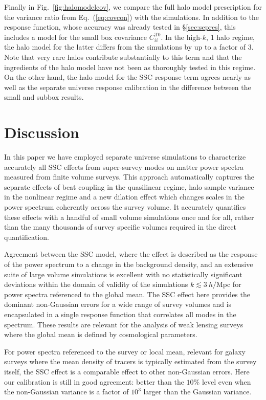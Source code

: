 \documentclass[prd,twocolumn,amsmath,amssymb,floatfix,superscriptaddress]{revtex4-1}
\begin{document}
{
Finally in Fig.~\ref{fig:halomodelcov}, we compare the full halo model prescription for the
variance ratio from Eq.~(\ref{eq:covcon}) with the simulations.   In addition to the 
response function, whose accuracy was already tested in \S \ref{sec:sepres}, this includes
a model for the small box covariance $C_{ii}^{\text{T}0}$.   In the high-$k$, 1 halo regime,
the halo model for the latter differs  from the simulations  by up to 
 a factor of 3.  Note that very rare halos contribute substantially to this term and
that the ingredients of the halo model have not been as thoroughly tested in this regime.
On the other hand, the halo model for the SSC response term agrees nearly as well
as the separate universe response calibration in the difference between the small and subbox results. }


\section{Discussion}
\label{sec:discussion}

In this paper we have employed separate universe simulations to characterize accurately
all SSC effects from super-survey modes on matter power spectra measured from finite
volume surveys.   This approach automatically captures the separate effects of beat
coupling in the quasilinear regime, halo sample variance in the nonlinear regime and
a new dilation effect which changes scales in the power spectrum coherently across
the survey volume.   It accurately quantifies these effects with a handful of small
volume simulations once and for all, rather than the many thousands of survey specific volumes
required in the direct quantification.

Agreement between the SSC model, where the effect is described as the response
of the power spectrum to a change in the background density, and an extensive
suite of large volume simulations is excellent with no statistically significant deviations
within the domain of validity of the simulations $k \lesssim 3~ h/$Mpc for power spectra
referenced to the global mean.    
The SSC effect here provides the dominant non-Gaussian errors for a wide range 
of survey volumes and is encapsulated in a single response function that correlates
all modes in the spectrum.  
These results are relevant for the analysis of weak
lensing surveys where the global mean is defined by cosmological parameters.   

For power spectra referenced to the survey or local mean, relevant for galaxy surveys where the
mean density of tracers is typically estimated from the survey itself, the SSC effect is
a comparable effect to other non-Gaussian errors.   Here our calibration is still in good 
 agreement: better than the $10\%$ level even when the non-Gaussian variance
is a factor of $10^3$ larger than the Gaussian variance.  
\end{document}
